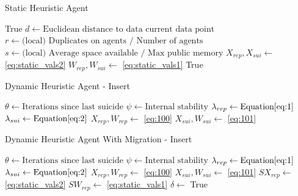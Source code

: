 \documentclass{UoYCSproject}
\begin{document}
\begin{algorithm}
\caption{Static Heuristic Agent}
\label{Agent_Control_Loop2}
\begin{algorithmic}[1]
\State {}
\State
{}
\State {}
\State \Return True
\EndIf
\State
\State $d \gets \text{Euclidean distance to data current data point}$
\State $r \gets \text{(local) Duplicates on agents / Number of agents}$
\State $s \gets \text{(local) Average space available / Max public memory}$
\State $X_{rep}, X_{sui} \gets $ \ref{eq:static_vals2}
\State $W_{rep}, W_{sui} \gets $ \ref{eq:static_vals1}
\State
{}
\State {}
\EndIf
\State
{}
\State {}
\EndIf
\State
\State {}
\State
\State \Return True
\EndProcedure
\end{algorithmic}
\end{algorithm}

\begin{algorithm}
\caption{Dynamic Heuristic Agent - Insert}
\label{Agent_Control_Loop3}
\begin{algorithmic}[1]
\State $\theta \gets \text{Iterations since last suicide}$
\State $\psi \gets \text{Internal stability}$
\State $\lambda_{rep} \gets \text{Equation} \ref{eq:1}$
\State $\lambda_{sui}  \gets \text{Equation} \ref{eq:2}$
\State $X_{rep}, W_{rep} \gets $ \ref{eq:100}
\State $X_{sui}, W_{sui} \gets $ \ref{eq:101}
\end{algorithmic}
\end{algorithm}

\begin{algorithm}
\caption{Dynamic Heuristic Agent With Migration - Insert}
\label{Agent_Control_Loop3}
\begin{algorithmic}[1]
\State $\theta \gets \text{Iterations since last suicide}$
\State $\psi \gets \text{Internal stability}$
\State $\lambda_{rep} \gets \text{Equation} \ref{eq:1}$
\State $\lambda_{sui}  \gets \text{Equation} \ref{eq:2}$
\State $X_{rep}, W_{rep} \gets $ \ref{eq:100}
\State $X_{sui}, W_{sui} \gets $ \ref{eq:101}
\State
\State $SX_{rep} \gets $ \ref{eq:static_vals2}
\State $SW_{rep} \gets $ \ref{eq:static_vals1}
\State
\State $\delta \gets$ 
\State
{}
\State {}
\State
{}
\State {}
\State \Return True
\EndIf
\EndIf
\end{algorithmic}
\end{algorithm}
\end{document}
